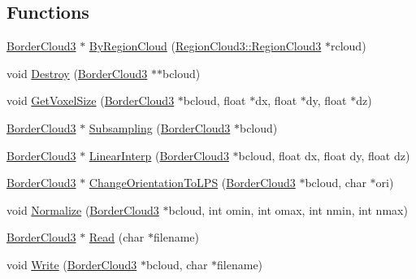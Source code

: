 \subsection*{Functions}
\begin{DoxyCompactItemize}
\item 
\hyperlink{namespacegft_1_1BorderCloud3_a798c6bba07803dbc165e7b806bad3e71}{Border\-Cloud3} $\ast$ \hyperlink{namespacegft_1_1BorderCloud3_a9972b84abf3a37cec2258dcdb0ad83dd}{By\-Region\-Cloud} (\hyperlink{namespacegft_1_1RegionCloud3_ae97ab7136c2a2a97ccc56e60025d0a1a}{Region\-Cloud3\-::\-Region\-Cloud3} $\ast$rcloud)
\item 
void \hyperlink{namespacegft_1_1BorderCloud3_aa0a6f6d2b055be8eeadf85120ecff10d}{Destroy} (\hyperlink{namespacegft_1_1BorderCloud3_a798c6bba07803dbc165e7b806bad3e71}{Border\-Cloud3} $\ast$$\ast$bcloud)
\item 
void \hyperlink{namespacegft_1_1BorderCloud3_acb30b61280c1f36685c3dcca0d3dcae6}{Get\-Voxel\-Size} (\hyperlink{namespacegft_1_1BorderCloud3_a798c6bba07803dbc165e7b806bad3e71}{Border\-Cloud3} $\ast$bcloud, float $\ast$dx, float $\ast$dy, float $\ast$dz)
\item 
\hyperlink{namespacegft_1_1BorderCloud3_a798c6bba07803dbc165e7b806bad3e71}{Border\-Cloud3} $\ast$ \hyperlink{namespacegft_1_1BorderCloud3_a3d5bcd8c618b220661829858fd52a3b7}{Subsampling} (\hyperlink{namespacegft_1_1BorderCloud3_a798c6bba07803dbc165e7b806bad3e71}{Border\-Cloud3} $\ast$bcloud)
\item 
\hyperlink{namespacegft_1_1BorderCloud3_a798c6bba07803dbc165e7b806bad3e71}{Border\-Cloud3} $\ast$ \hyperlink{namespacegft_1_1BorderCloud3_a9aeb8176f95e79f700f934bfbeb704a8}{Linear\-Interp} (\hyperlink{namespacegft_1_1BorderCloud3_a798c6bba07803dbc165e7b806bad3e71}{Border\-Cloud3} $\ast$bcloud, float dx, float dy, float dz)
\item 
\hyperlink{namespacegft_1_1BorderCloud3_a798c6bba07803dbc165e7b806bad3e71}{Border\-Cloud3} $\ast$ \hyperlink{namespacegft_1_1BorderCloud3_a6a2fc75eba0f7ed8a02673397325dfa5}{Change\-Orientation\-To\-L\-P\-S} (\hyperlink{namespacegft_1_1BorderCloud3_a798c6bba07803dbc165e7b806bad3e71}{Border\-Cloud3} $\ast$bcloud, char $\ast$ori)
\item 
void \hyperlink{namespacegft_1_1BorderCloud3_a983ea84c33184c929345d7b424a2fd88}{Normalize} (\hyperlink{namespacegft_1_1BorderCloud3_a798c6bba07803dbc165e7b806bad3e71}{Border\-Cloud3} $\ast$bcloud, int omin, int omax, int nmin, int nmax)
\item 
\hyperlink{namespacegft_1_1BorderCloud3_a798c6bba07803dbc165e7b806bad3e71}{Border\-Cloud3} $\ast$ \hyperlink{namespacegft_1_1BorderCloud3_af470c898a56fad09b458658a53a765d4}{Read} (char $\ast$filename)
\item 
void \hyperlink{namespacegft_1_1BorderCloud3_ae40b926e86ff6f22c721e748410108ad}{Write} (\hyperlink{namespacegft_1_1BorderCloud3_a798c6bba07803dbc165e7b806bad3e71}{Border\-Cloud3} $\ast$bcloud, char $\ast$filename)
\end{DoxyCompactItemize}


